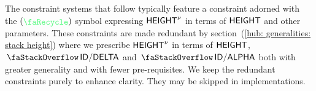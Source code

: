 The  constraint systems that follow typically feature a constraint adorned with the $(\sanityCheck)$ symbol expressing $\textsf{HEIGHT}^{\nu}$ in terms of $\textsf{HEIGHT}$ and other parameters.
These constraints are made redundant by section~(\ref{hub: generalities: stack height}) where we prescribe $\textsf{HEIGHT}^{\nu}$ in terms of $\textsf{HEIGHT}$, $\stackDelta$ and $\stackAlpha$ both with greater generality and with fewer pre-requisites.
We keep the redundant constraints purely to enhance clarity.
They may be skipped in implementations.
